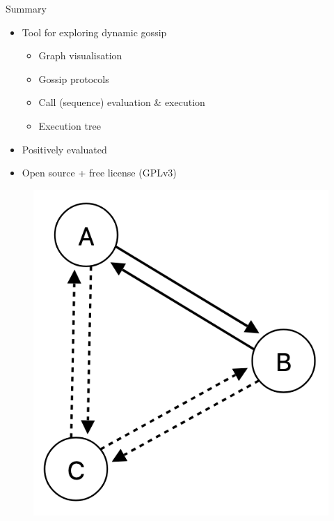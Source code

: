 \documentclass[aspectratio=169]{beamer}
\begin{document}
\begin{frame}[c]{Summary}
    \begin{multicols}{2}
        \begin{itemize}
            \item Tool for exploring dynamic gossip
            \begin{itemize}
                \item Graph visualisation
                \item Gossip protocols
                \item Call (sequence) evaluation \& execution
                \item Execution tree
            \end{itemize}
            \item Positively evaluated
            \item Open source + free license (GPLv3)
        \end{itemize}
        \columnbreak
        \begin{figure}
            \centering
            \includegraphics[width=.55\linewidth]{images/graph.png}
        \end{figure}
    \end{multicols}
\end{frame}
\end{document}
